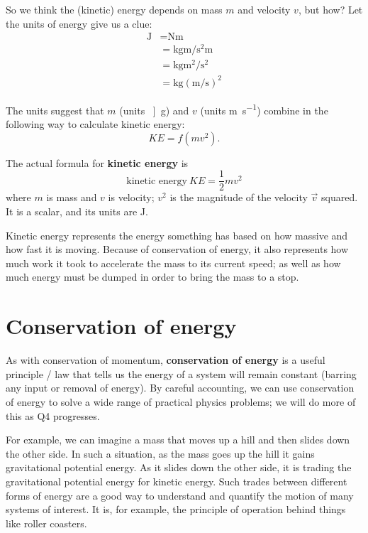 \documentclass[handout]{tufte-handout}
\begin{document}
So we think the (kinetic) energy depends on mass $m$ and velocity $v$, but how? Let the units of energy give us a clue:
\begin{align}
\si{\joule} &= \si{\newton}\si{\meter} \\
&=\si{\kilo\gram\meter\per\second\squared} \si{\meter} \\
&= \si{\kilo\gram\meter\squared\per\second\squared} \\
&= \si{\kilo\gram} \left( \si{\meter\per\second}\right)^2 
\end{align}

The units suggest that $m$ (units \si{\kilo]\gram}) and $v$ (units \si{\meter\per\second}) combine in the following way to calculate kinetic energy: 
\begin{equation}
KE = f(mv^2).
\end{equation}

The actual formula for \textbf{kinetic energy} is
\begin{equation}
\text{kinetic energy}\ KE = \frac{1}{2} mv^2
\end{equation}
where $m$ is mass and $v$ is velocity; $v^2$ is the magnitude of the velocity $\vec{v}$ squared. It is a scalar, and its units are \si{\joule}. 

Kinetic energy represents the energy something has based on how massive and how fast it is moving. Because of conservation of energy, it also represents how much work it took to accelerate the mass to its current speed; as well as how much energy must be dumped in order to bring the mass to a stop. 





\section{Conservation of energy} 
As with conservation of momentum, \textbf{conservation of energy} is a useful principle / law that tells us the energy of a system will remain constant (barring any input or removal of energy). By careful accounting, we can use conservation of energy to solve a wide range of practical physics problems; we will do more of this as Q4 progresses. 

For example, we can imagine a mass that moves up a hill and then slides down the other side. In such a situation, as the mass goes up the hill it gains gravitational potential energy. As it slides down the other side, it is trading the gravitational potential energy for kinetic energy. Such trades between different forms of energy are a good way to understand and quantify the motion of many systems of interest. It is, for example, the principle of operation behind things like roller coasters. 
\end{document}

